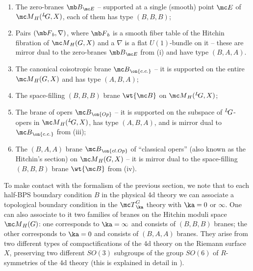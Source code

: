 \documentclass[11pt,reqno]{amsart}
\theoremstyle{plain}
\numberwithin{equation}{section}
\def\neg{\negthinspace}
\def\LG{{}^L\neg G}
\theoremstyle{definition}
\begin{document}
\begin{enumerate}

\item The zero-branes ${\mb B}_{\mc E}$ -- supported at a single
  (smooth) point ${\mc E}$ of ${\mc M}_H(\LG,X)$, each of them has
  type $(B,B,B)$;

\medskip

\item Pairs $({\mb F}_b,\nabla)$, where ${\mb F}_b$ is a smooth fiber 
table of the Hitchin fibration of ${\mc M}_H(G,X)$ and a $\nabla$ is a
  flat $U(1)$-bundle on it -- these are mirror dual to the zero-branes
  ${\mb B}_{\mc E}$ from (i) and have type $(B,A,A)$.

\medskip

\item The canonical coisotropic brane ${\mc B}_{\on{c.c.}}$ -- it
is supported on the entire ${\mc M}_H(G,X)$ and has type $(A,B,A)$;

\medskip

\item The space-filling $(B,B,B)$ brane $\wt{\mc B}$ on ${\mc
    M}_H(\LG,X)$;

\medskip

\item The brane of opers ${\mc B}_{\on{Op}}$ -- it is supported on the
  subspace of $\LG$-opers in ${\mc M}_H(\LG,X)$, has type $(A,B,A)$,
  and is mirror dual to ${\mc B}_{\on{c.c.}}$ from (iii);

\medskip

\item The $(B,A,A)$ brane ${\mc B}_{\on{cl.Op}}$ of ``classical
  opers'' (also known as the Hitchin's section) on ${\mc M}_H(G,X)$ --
  it is mirror dual to the space-filling $(B,B,B)$ brane $\wt{\mc B}$
  from (iv).

\end{enumerate}

\medskip

To make contact with the formalism of the previous section, we note
that to each half-BPS boundary condition $B$ in the physical 4d
theory we can associate a topological boundary condition in the ${\mc
  T}^G_\ka$ theory with $\ka=0$ or $\infty$.  One can also associate
to it two families of branes on the Hitchin moduli space ${\mc
  M}_H(G)$: one corresponds to $\ka=\infty$ and consists of $(B,B,B)$
branes; the other corresponds to $\ka=0$ and consists of $(B,A,A)$
branes. They arise from two different types of compactifications of
the 4d theory on the Riemann surface $X$, preserving two different
$SO(3)$ subgroups of the group $SO(6)$ of $R$-symmetries of the 4d
theory (this is explained in detail in \cite{Ga1,Ga2}).
\end{document}

